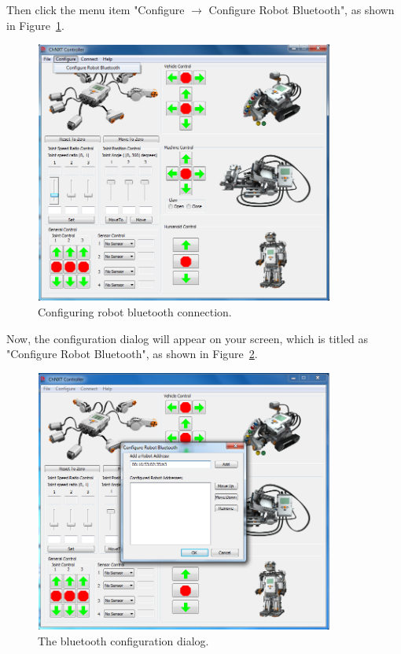 \documentclass[11pt]{article}
\begin{document}
Then click the menu item "Configure $\rightarrow$ Configure Robot Bluetooth", as shown in Figure~\ref{fig:menu_config}.

\begin{figure}[H]
  \begin{center}
    \includegraphics[height=3.4in]{figure/configuration/menuConfig.png}
    \caption{Configuring robot bluetooth connection.\label{fig:menu_config}}
  \end{center}
\end{figure}

Now, the configuration dialog will appear on your screen, which is titled as "Configure Robot Bluetooth", as shown in 
Figure~\ref{fig:config_dialog}.

\begin{figure}[H]
  \begin{center}
    \includegraphics[height=3.4in]{figure/configuration/configDlg.png}
    \caption{The bluetooth configuration dialog.\label{fig:config_dialog}}
  \end{center}
\end{figure}
\end{document}
